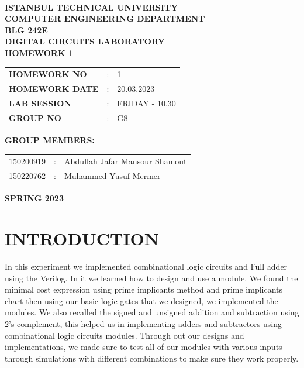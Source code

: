 \documentclass[pdftex,12pt,a4paper]{article}
\begin{document}
\begin{titlepage}
\begin{center}
\textbf{}\\
\textbf{\Large{ISTANBUL TECHNICAL UNIVERSITY}}\\
\vspace{0.5cm}
\textbf{\Large{COMPUTER ENGINEERING DEPARTMENT}}\\
\vspace{2cm}
\textbf{\Large{BLG 242E\\ DIGITAL CIRCUITS LABORATORY\\ HOMEWORK 1}}\\
\vspace{2.8cm}
\begin{table}[ht]
\centering
\Large{
\begin{tabular}{lcl}
\textbf{HOMEWORK NO}  & : & 1 \\
\textbf{HOMEWORK DATE}  & : & 20.03.2023\\
\textbf{LAB SESSION}  & : & FRIDAY - 10.30 \\
\textbf{GROUP NO}  & : & G8 \\
\end{tabular}}
\end{table}
\vspace{1cm}
\textbf{\Large{GROUP MEMBERS:}}\\
\begin{table}[ht]
\centering
\Large{
\begin{tabular}{rcl}
150200919  & : & Abdullah Jafar Mansour Shamout \\
150220762  & : & Muhammed Yusuf Mermer  \\
\end{tabular}}
\end{table}
\vspace{2.8cm}
\textbf{\Large{SPRING 2023}}

\end{center}

\end{titlepage}

\thispagestyle{empty}
\setcounter{tocdepth}{4}
\tableofcontents
\clearpage

\setcounter{page}{1}

\section{INTRODUCTION}
In this experiment we implemented combinational logic circuits and Full adder
using the Verilog. In it we learned how to design and use a module. We found the minimal cost expression using prime implicants method and prime implicants chart then using our basic logic gates that we designed, we implemented the modules. We also recalled the signed and unsigned addition and subtraction using 2's complement, this helped us in implementing adders and subtractors using combinational logic circuits modules. Through out our designs and implementations, we made sure to test all of our modules with various inputs through simulations with different combinations to make sure they work properly.
\end{document}
